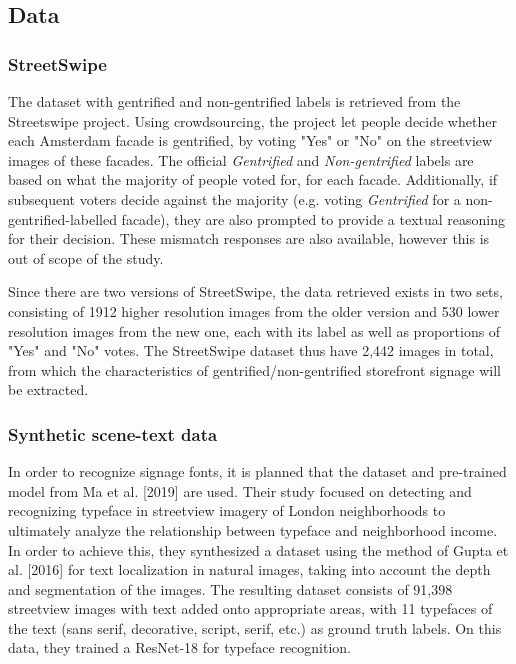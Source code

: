 \subsection{Data}
\subsubsection{StreetSwipe}
The dataset with gentrified and non-gentrified labels is retrieved from the Streetswipe project. Using crowdsourcing, the project let people decide whether each Amsterdam facade is gentrified, by voting "Yes" or "No" on the streetview images of these facades. The official \textit{Gentrified} and \textit{Non-gentrified} labels are based on what the majority of people voted for, for each facade. Additionally, if subsequent voters decide against the majority (e.g. voting \textit{Gentrified} for a non-gentrified-labelled facade), they are also prompted to provide a textual reasoning for their decision. These mismatch responses are also available, however this is out of scope of the study. 

Since there are two versions of StreetSwipe, the data retrieved exists in two sets, consisting of 1912 higher resolution images from the older version and 530 lower resolution images from the new one, each with its label as well as proportions of "Yes" and "No" votes. The StreetSwipe dataset thus have 2,442 images in total, from which the characteristics of gentrified/non-gentrified storefront signage will be extracted.

\subsubsection{Synthetic scene-text data}
In order to recognize signage fonts, it is planned that the dataset and pre-trained model from Ma et al. [2019] \cite{ma2019} are used. Their study focused on detecting and recognizing typeface in streetview imagery of London neighborhoods to ultimately analyze the relationship between typeface and neighborhood income. In order to achieve this, they synthesized a dataset using the method of Gupta et al. [2016] \cite{gupta2016} for text localization in natural images, taking into account the depth and segmentation of the images. The resulting dataset consists of 91,398 streetview images with text added onto appropriate areas, with 11 typefaces of the text (sans serif, decorative, script, serif, etc.) as ground truth labels. On this data, they trained a ResNet-18 for typeface recognition. 

